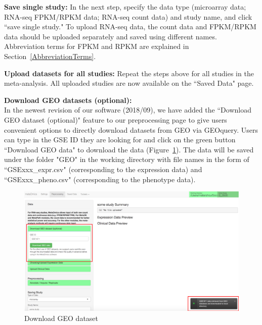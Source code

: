 \begin{steps}
\item \textbf{Save single study:}
In the next step,
specify the data type (microarray data; RNA-seq FPKM/RPKM data; RNA-seq count data) and study name,
and click ``save single study."
To upload RNA-seq data, the count data and FPKM/RPKM
 data should be uploaded separately and saved using different names.
Abbreviation terms for FPKM and RPKM are explained in Section~\ref{AbbreviationTerms}.

\item \textbf{Upload datasets for all studies:}
Repeat the steps above for all studies in the meta-analysis.
All uploaded studies are now available on the ``Saved Data" page. 
 
\end{steps}

\textbf{Download GEO datasets (optional):} \\

In the newest revision of our software (2018/09), we have added the ``Download GEO dataset (optional)" feature to our preprocessing page to give users convenient options to directly download datasets from GEO via GEOquery. Users can type in the GSE ID they are looking for and click on the green button ``Download GEO data" to download the data (Figure~\ref{fig:GEO_1}). The data will be saved under the folder "GEO" in the working directory with file names in the form of ``GSExxx\_expr.csv" (corresponding to the expression data) and  ``GSExxx\_pheno.csv" (corresponding to the phenotype data).

\begin{figure}[H]
\begin{center}
\includegraphics[scale=0.5]{./figure/preprocessing/geo_1}
\caption{Download GEO dataset}
\label{fig:GEO_1}
\end{center}
\end{figure}

